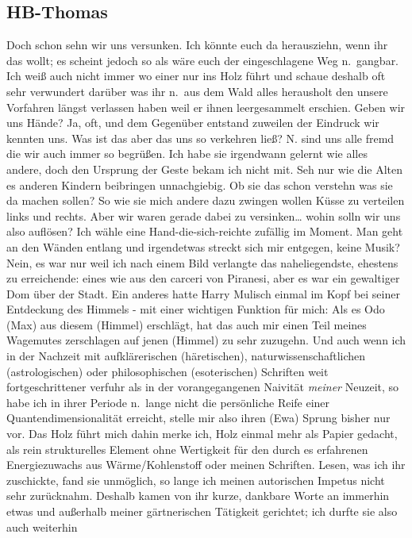 \documentclass[
]{article}
\author{}
\date{\vspace{-2.5em}}
\begin{document}
\subsection{HB-Thomas}\label{hb-thomas}

Doch schon sehn wir uns versunken. Ich könnte euch da herausziehn, wenn
ihr das wollt; es scheint jedoch so als wäre euch der eingeschlagene Weg
n.~gangbar. Ich weiß auch nicht immer wo einer nur ins Holz führt und
schaue deshalb oft sehr verwundert darüber was ihr n.~aus dem Wald alles
herausholt den unsere Vorfahren längst verlassen haben weil er ihnen
leergesammelt erschien. Geben wir uns Hände? Ja, oft, und dem Gegenüber
entstand zuweilen der Eindruck wir kennten uns. Was ist das aber das uns
so verkehren ließ? N. sind uns alle fremd die wir auch immer so
begrüßen. Ich habe sie irgendwann gelernt wie alles andere, doch den
Ursprung der Geste bekam ich nicht mit. Seh nur wie die Alten es anderen
Kindern beibringen unnachgiebig. Ob sie das schon verstehn was sie da
machen sollen? So wie sie mich andere dazu zwingen wollen Küsse zu
verteilen links und rechts. Aber wir waren gerade dabei zu
versinken\ldots{} wohin solln wir uns also auflösen? Ich wähle eine
Hand-die-sich-reichte zufällig im Moment. Man geht an den Wänden entlang
und irgendetwas streckt sich mir entgegen, keine Musik? Nein, es war nur
weil ich nach einem Bild verlangte das naheliegendste, ehestens zu
erreichende: eines wie aus den carceri von Piranesi, aber es war ein
gewaltiger Dom über der Stadt. Ein anderes hatte Harry Mulisch einmal im
Kopf bei seiner Entdeckung des Himmels - mit einer wichtigen Funktion
für mich: Als es Odo (Max) aus diesem (Himmel) erschlägt, hat das auch
mir einen Teil meines Wagemutes zerschlagen auf jenen (Himmel) zu sehr
zuzugehn. Und auch wenn ich in der Nachzeit mit aufklärerischen
(häretischen), naturwissenschaftlichen (astrologischen) oder
philosophischen (esoterischen) Schriften weit fortgeschrittener verfuhr
als in der vorangegangenen Naivität \emph{meiner} Neuzeit, so habe ich
in ihrer Periode n.~lange nicht die persönliche Reife einer
Quantendimensionalität erreicht, stelle mir also ihren (Ewa) Sprung
bisher nur vor. Das Holz führt mich dahin merke ich, Holz einmal mehr
als Papier gedacht, als rein strukturelles Element ohne Wertigkeit für
den durch es erfahrenen Energiezuwachs aus Wärme/Kohlenstoff oder meinen
Schriften. Lesen, was ich ihr zuschickte, fand sie unmöglich, so lange
ich meinen autorischen Impetus nicht sehr zurücknahm. Deshalb kamen von
ihr kurze, dankbare Worte an immerhin etwas und außerhalb meiner
gärtnerischen Tätigkeit gerichtet; ich durfte sie also auch weiterhin
\end{document}
